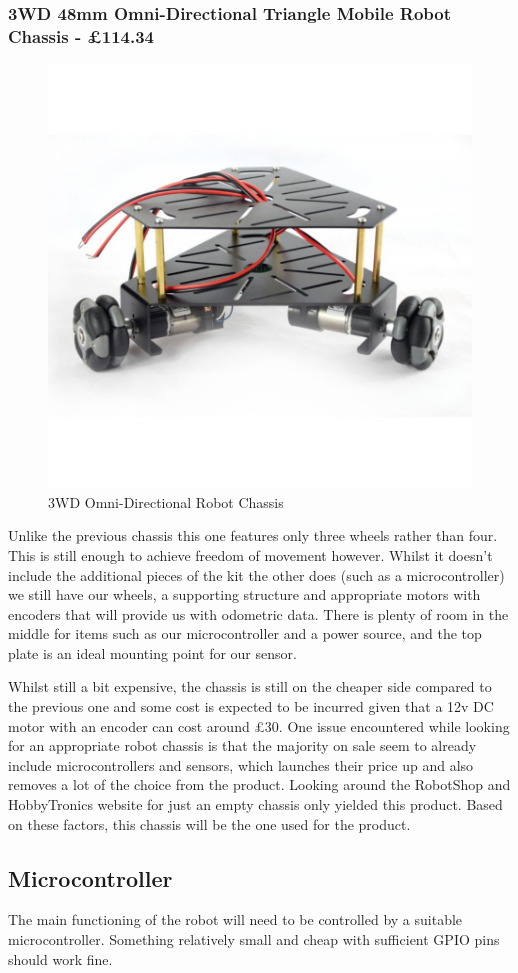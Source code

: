 					\subsubsection{3WD 48mm Omni-Directional Triangle Mobile Robot Chassis - \pounds{114.34}}
					\begin{figure}[h]
						\centering
						\includegraphics[width=.3\linewidth]{ANALYSIS/3wdomnidirectionalchassis.jpg}
						\caption{3WD Omni-Directional Robot Chassis}
						\label{fig:2}
					\end{figure}
					Unlike the previous chassis this one features only three wheels rather than four. This is still enough to achieve freedom of movement however. Whilst it doesn't include the additional pieces of the kit the other does (such as a microcontroller) we still have our wheels, a supporting structure and appropriate motors with encoders that will provide us with odometric data. There is plenty of room in the middle for items such as our microcontroller and a power source, and the top plate is an ideal mounting point for our sensor.
					
					Whilst still a bit expensive, the chassis is still on the cheaper side compared to the previous one and some cost is expected to be incurred given that a 12v DC motor with an encoder can cost around \pounds{30}. One issue encountered while looking for an appropriate robot chassis is that the majority on sale seem to already include microcontrollers and sensors, which launches their price up and also removes a lot of the choice from the product. Looking around the RobotShop and HobbyTronics website for just an empty chassis only yielded this product. Based on these factors, this chassis will be the one used for the product.
			
			
			
				\subsection{Microcontroller}
				The main functioning of the robot will need to be controlled by a suitable microcontroller. Something relatively small and cheap with sufficient GPIO pins should work fine.
				
